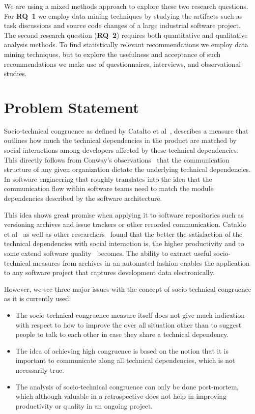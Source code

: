 We are using a mixed methods approach to explore these two research questions.
For \textbf{RQ~1} we employ data mining techniques by studying the artifacts such as task discussions and source code changes of a large industrial software project.
The second research question (\textbf{RQ~2}) requires both quantitative and qualitative analysis methods.
To find statistically relevant recommendations we employ data mining techniques, but to explore the usefulness and acceptance of such recommendations we make use of questionnaires, interviews, and observational studies.

\section{Problem Statement}
Socio-technical congruence as defined by Catalto et al~\cite{cataldo:cscw:2006}, describes a measure that outlines how much the technical dependencies in the product are matched by social interactions among developers affected by these technical dependencies.
This directly follows from Conway's observations~\cite{conway:datamination:1968} that the communication structure of any given organization dictate the underlying technical dependencies.
In software engineering that roughly translates into the idea that the communication flow within software teams need to match the module dependencies described by the software architecture. 
 
This idea shows great promise when applying it to software repositories such as versioning archives and issue trackers or other recorded communication.
Cataldo et al~\cite{cataldo:cscw:2006,cataldo:esem:2008} as well as other researchers~\cite{valetto:msr:2007,ehrlich:stc:2008} found that the better the satisfaction of the technical dependencies with social interaction is, the higher productivity and to some extend software quality~\cite{kwan:tse:2011,bird:issre:2009,kwan:stc:2009} becomes.
The ability to extract useful socio-technical measures from archives in an automated fashion enables the application to any software project that captures development data electronically.

However, we see three major issues with the concept of socio-technical congruence as it is currently used:
\begin{itemize}
\item The socio-technical congruence measure itself does not give much indication with respect to how to improve the over all situation other than to suggest people to talk to each other in case they share a technical dependency. 
\item The idea of achieving high congruence is based on the notion that it is important to communicate along all technical dependencies, which is not necessarily true.
\item The analysis of socio-technical congruence can only be done post-mortem, which although valuable in a retrospective does not help in improving productivity or quality in an ongoing project.
\end{itemize}


